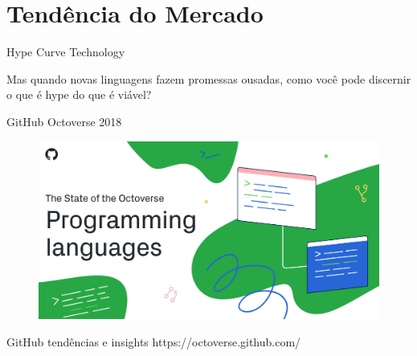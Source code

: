 \section{Tendência do Mercado}

\begin{frame}[fragile]{Hype Curve Technology}
\begin{figure}[ht!]
  \centering
  
\end{figure}
\begin{center}
\small{Mas quando novas linguagens fazem promessas ousadas, como você pode discernir o que é hype do que é viável?}
\end{center}
\end{frame}

\begin{frame}[fragile]{GitHub Octoverse 2018}
\begin{figure}[ht!]
  \centering
  \includegraphics[scale=0.3]{images/octoverse.png}
\end{figure}
\begin{center}
\small{GitHub tendências e insights}
\small{https://octoverse.github.com/}
\end{center}
\end{frame}

